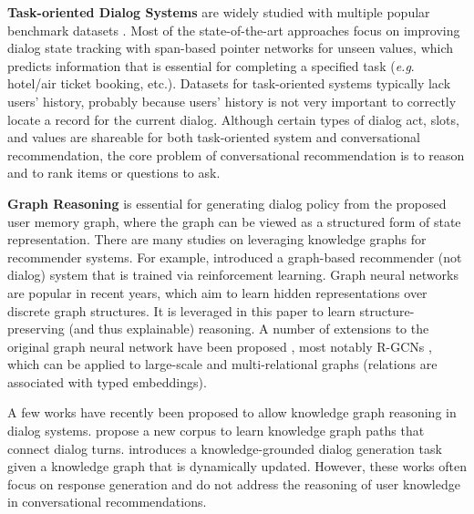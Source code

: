 \documentclass[11pt,a4paper]{article}
\makeatletter
\DeclareRobustCommand\onedot{\futurelet\@let@token\@onedot}
\def\onedot{. }
\def\eg{\emph{e.g}\onedot} \def\Eg{\emph{E.g}\onedot}
\newcommand{\todo}[1]{{\color{red}{\small\bf\sf [TO DO: #1]}}}
\makeatother
\begin{document}
\noindent \textbf{Task-oriented Dialog Systems} are widely studied with multiple popular benchmark datasets \cite{dstc2, woz, multiwoz, multiwoz2.1,sgd-dst}.
Most of the state-of-the-art approaches \cite{trade,bert-dst-alexa,bert-dst-cmu} focus on improving dialog state tracking with span-based pointer networks for unseen values, which predicts information that is essential for completing a specified task (\eg hotel/air ticket booking, etc.).
Datasets for task-oriented systems typically lack users' history, probably because users' history is not very important to correctly locate a record for the current dialog.
Although certain types of dialog act, slots, and values are shareable for both task-oriented system and conversational recommendation, the core problem of conversational recommendation is to reason and to rank items or questions to ask. %

\noindent \textbf{Graph Reasoning} is essential for generating dialog policy from the proposed user memory graph, where the graph can be viewed as a structured form of state representation. 
There are many studies on leveraging knowledge graphs for recommender systems. For example, \citep{Xian2019ReinforcementKG} introduced a graph-based recommender (not dialog) system that is trained via reinforcement learning.
Graph neural networks are popular in recent years, which aim to learn hidden representations over discrete graph structures\cite{scarselli2008graph,duvenaud2015convolutional,defferrard2016convolutional,kipf2016semi}. 
It is leveraged in this paper to learn structure-preserving (and thus explainable) reasoning.
A number of extensions to the original graph neural network have been proposed \cite{li2015gated,pham2017column},
most notably R-GCNs \cite{schlichtkrull2018modeling}, which can be applied to large-scale and multi-relational graphs (relations are associated with typed embeddings).

A few works have recently been proposed to allow knowledge graph reasoning in dialog systems.
\cite{Moon+19a, Moon+19b} propose a new corpus to learn knowledge graph paths that connect dialog turns.
\cite{tuan-etal-2019-dykgchat} introduces a knowledge-grounded dialog generation task given a knowledge graph that is dynamically updated.
However, these works often focus on response generation and do not address the reasoning of user knowledge in conversational recommendations.
\end{document}
